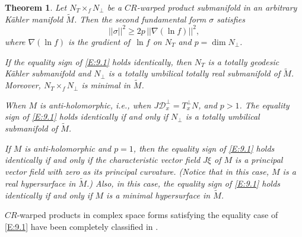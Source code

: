 \documentclass{amsart}
\theoremstyle{plain}
\newtheorem{theorem}{Theorem}[section]
\numberwithin{equation}{section}
\theoremstyle{remark}
\numberwithin{equation}{section}
\begin{document}
\begin{theorem} \label{T:9.2}  Let $N_T\times_f N_\perp$ be a  $CR$-warped product submanifold in an arbitrary K\"ahler manifold $\tilde M$. Then the second fundamental form $\sigma$ satisfies
\begin{equation}\label{E:9.1}||\sigma||^2\geq 2p\,||\nabla(\ln f)||^2,\end{equation} where $\nabla (\ln f)$ is the gradient of $\,\ln f$ on $N_T$ and $p=\dim N_\perp$.

If the equality sign of \eqref{E:9.1}  holds identically, then $N_T$ is a totally geodesic K\"ahler submanifold and $N_\perp$ is a totally
umbilical totally real submanifold of $\tilde M$. Moreover, $N_T\times_f N_\perp$ is  minimal in $\tilde M$.

 When $M$ is anti-holomorphic, i.e., when $J\mathcal D^\perp_x=T^\perp_xN$, and $p>1$. The equality sign of \eqref{E:9.1}  holds identically if and only if   $N_\perp$ is a totally umbilical submanifold of $\tilde M$.

 If $M$ is anti-holomorphic and $p=1$, then the equality sign of \eqref{E:9.1} holds identically if and only if  the characteristic vector field $J\xi$ of $M$ is a principal vector field with zero as its principal curvature. (Notice that in this case, $M$ is a real hypersurface in $\tilde M$.) Also, in this case, the equality sign of \eqref{E:9.1} holds identically if and only if $M$ is a minimal hypersurface in $\tilde M$.
 \end{theorem}  

$CR$-warped products in complex space forms satisfying the equality case of \eqref{E:9.1} have been completely classified in \cite{c7,c8}.
\end{document}
